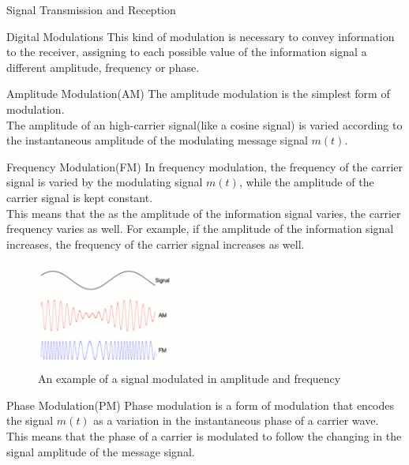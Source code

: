 \begin{section}{Signal Transmission and Reception}
\begin{subsection}{Digital Modulations}
    This kind of modulation is necessary to convey information to the receiver, assigning to each
    possible value of the information signal a different amplitude, frequency or phase.
    \begin{subsubsection}{Amplitude Modulation(AM)}
      The amplitude modulation is the simplest form of modulation.\\
      The amplitude of an high-carrier signal(like a cosine signal) is varied according to the 
      instantaneous amplitude of the modulating message signal $m(t)$.\\
    \end{subsubsection}
    \begin{subsubsection}{Frequency Modulation(FM)}
      In frequency modulation, the frequency of the carrier signal is varied by the modulating
      signal $m(t)$, while the amplitude of the carrier signal is kept constant.\\
      This means that the as the amplitude of the information signal varies, the carrier frequency
      varies as well. For example, if the amplitude of the information signal increases, the
      frequency of the carrier signal increases as well.\\
      \begin{figure}[h]
        \centering
        \includegraphics[width=0.4\textwidth]{img/wireless/AM-FM.png}
        \caption{An example of a signal modulated in amplitude and frequency}
        \label{fig:AM-FM}
      \end{figure}
    \end{subsubsection}
    \begin{subsubsection}{Phase Modulation(PM)}
      Phase modulation is a form of modulation that encodes the signal $m(t)$ as a variation in the
      instantaneous phase of a carrier wave.\\
      This means that the phase of a carrier is modulated to follow the changing in the signal 
      amplitude of the message signal.\\


\end{subsubsection}
\end{subsection}
\end{section}
